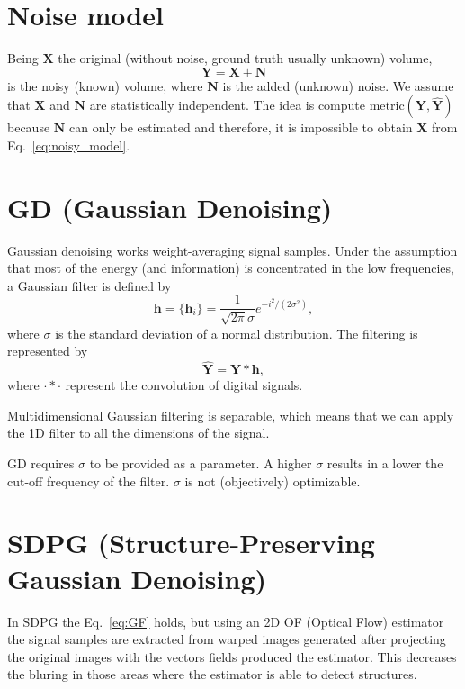\documentclass{article}
\begin{document}
\section{Noise model}

Being $\mathbf{X}$ the original (without noise, ground truth usually unknown) volume,
\begin{equation}
  \mathbf{Y} = \mathbf{X} + \mathbf{N}
  \label{eq:noisy_model}
\end{equation}
is the noisy (known) volume, where $\mathbf{N}$ is the added (unknown)
noise. We assume that $\mathbf{X}$ and $\mathbf{N}$ are statistically
independent. The idea is compute
$\text{metric}(\mathbf{Y}, \hat{\mathbf{Y}})$ because $\mathbf{N}$ can
only be estimated and therefore, it is impossible to obtain
$\mathbf{X}$ from Eq.~\ref{eq:noisy_model}.

\section{GD (Gaussian Denoising)}

Gaussian denoising works weight-averaging signal samples. Under the
assumption that most of the energy (and information) is concentrated
in the low frequencies, a Gaussian filter is defined by
\begin{equation}
  \mathbf{h} = \{\mathbf{h}_i\} = \frac{1}{\sqrt{2\pi}\sigma}e^{{-i}^2/(2\sigma^2)},
\end{equation}
where $\sigma$ is the standard deviation of a normal distribution. The
filtering is represented by
\begin{equation}
  \hat{\mathbf{Y}} = \mathbf{Y}*\mathbf{h},
  \label{eq:GF}
\end{equation}
where $\cdot*\cdot$ represent the convolution of digital signals.

Multidimensional Gaussian filtering is separable, which means that we
can apply the 1D filter to all the dimensions of the signal.

GD requires $\sigma$ to be provided as a parameter. A higher $\sigma$
results in a lower the cut-off frequency of the filter. $\sigma$ is
not (objectively) optimizable.

\section{SDPG (Structure-Preserving Gaussian Denoising) \cite{gonzalez2023structure}}

In SDPG the Eq.~\ref{eq:GF} holds, but using an 2D OF (Optical Flow) estimator
the signal samples are extracted from warped images generated
after projecting the original images with the vectors fields produced
the estimator. This decreases the bluring in those areas where the
estimator is able to detect structures.
\end{document}
